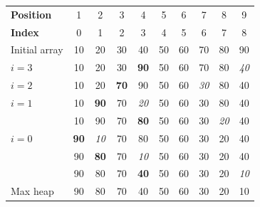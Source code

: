\begin{center}
{\footnotesize
\begin{tabular}{|l|c|c|c|c|c|c|c|c|c|}
\hline
\textbf{Position}& 1& 2& 3& 4& 5& 6& 7& 8& 9 \\
\textbf{Index}& 0& 1& 2& 3& 4& 5& 6& 7& 8 \\
\hline
Initial array& 10& 20& 30& 40& 50& 60& 70& 80& 90 \\
\hline
$i=3$& 10& 20& 30& \textbf{90} & 50& 60& 70& 80& \textit{40} \\
$i=2$& 10& 20& \textbf{ 70}& 90& 50& 60& \textit{30}& 80& 40 \\
$i=1$& 10& \textbf{90}& 70& \textit{20}& 50& 60& 30& 80& 40 \\
     & 10& 90& 70& \textbf{ 80}& 50& 60& 30& \textit{20}& 40 \\
$i=0$& \textbf{ 90}& \textit{10}& 70& 80& 50& 60& 30& 20& 40 \\
     & 90& \textbf{80}& 70& \textit{10}& 50& 60& 30& 20& 40 \\
     & 90& 80& 70& \textbf{40}& 50& 60& 30& 20& \textit{10} \\
\hline
Max heap& 90& 80& 70& 40& 50& 60& 30& 20& 10 \\
\hline
\end{tabular}
}
\end{center}
%

